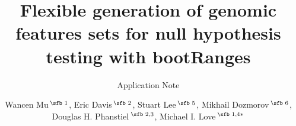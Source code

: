 \documentclass{bioinfo}
\begin{document}

\subtitle{Application Note}

\title[short Title]{Flexible generation of genomic features sets for null hypothesis testing with bootRanges}
\author[Sample \textit{et~al}.]{Wancen Mu\,$^{\text{\sfb 1}}$, Eric Davis\,$^{\text{\sfb 2}}$, Stuart Lee\,$^{\text{\sfb 5}}$, Mikhail Dozmorov\,$^{\text{\sfb 6}}$, Douglas H. Phanstiel\,$^{\text{\sfb 2,3}}$, Michael I. Love\,$^{\text{\sfb 1,4}*}$}
\address{$^{\text{\sf 1}}$Department of Biostatistics, $^{\text{\sf 2}}$Curriculum in Bioinformatics and Computational Biology, $^{\text{\sf 3}}$Thurston Arthritis Research Center, Department of Cell Biology \& Physiology, Lineberger Comprehensive Cancer Center, Curriculum in Genetics \& Molecular Biology, and $^{\text{\sf 4}}$ Department of Genetics, University of North Carolina-Chapel Hill, NC 27599
$^{\text{\sf 5}}$Genentech, South San Francisco, CA, USA $^{\text{\sf 6}}$Department of Biostatistics, Department of Pathology, Virginia Commonwealth University, Richmond, VA 23298.\\}





\maketitle
{}





%
%
%
%
%
%
%

\end{document}
